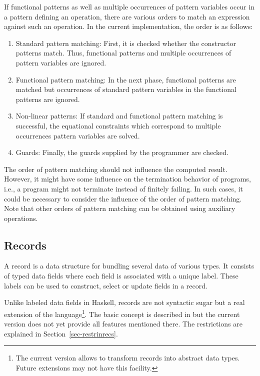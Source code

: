 If functional patterns as well as multiple occurrences of
pattern variables occur in a pattern defining an operation,
there are various orders to match an expression against such
an operation. In the current implementation, the order
is as follows:
\begin{enumerate}
\item Standard pattern matching: First, it is checked whether
the constructor patterns match. Thus, functional patterns
and multiple occurrences of pattern variables are ignored.
\item Functional pattern matching: In the next phase,
functional patterns are matched but occurrences of standard
pattern variables in the functional patterns are ignored.
\item Non-linear patterns: If standard and functional pattern matching
is successful, the equational constraints which correspond
to multiple occurrences pattern variables are solved.
\item Guards: Finally, the guards supplied by the programmer
are checked.
\end{enumerate}
The order of pattern matching should not influence the computed
result. However, it might have some influence on the termination
behavior of programs, i.e., a program might not terminate
instead of finitely failing.
In such cases, it could be necessary to consider the influence
of the order of pattern matching. Note that other orders of pattern matching
can be obtained using auxiliary operations.



\subsection {Records}
\label{records}

A record is a data structure for bundling several data of various types.
It consists of typed data fields where each field is associated with
a unique label. These labels can be used to construct, select or update
fields in a record.


Unlike labeled data fields in Haskell, records are
not syntactic sugar but a real extension of the
language\footnote{The current version allows to transform records
  into abstract data types. Future extensions may not have
  this facility.}.
The basic concept is described in \cite{Leijen05} but the current
version does not yet provide all features mentioned there.
The restrictions are explained in Section~\ref{sec-restrinrecs}.

